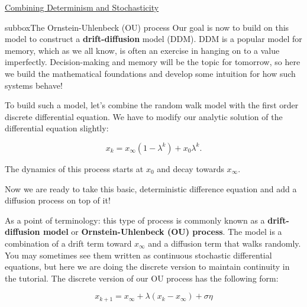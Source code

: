 \begin{textbox}{\href{https://compneuro.neuromatch.io/tutorials/W2D2_LinearSystems/student/W2D2_Tutorial3.html}{Combining Determinism and Stochasticity } }

\begin{subbox}{subbox}{The Ornstein-Uhlenbeck (OU) process}
\scriptsize
Our goal is now to build on this model to construct a \textbf{drift-diffusion} model (DDM). DDM is a popular model for memory, which as we all know, is often an exercise in hanging on to a value imperfectly. Decision-making and memory will be the topic for tomorrow, so here we build the mathematical foundations and develop some intuition for how such systems behave!

To build such a model, let's combine the random walk model with the first order discrete differential equation. We have to modify our analytic solution of the differential equation slightly:

\[x_k = x_\infty(1 - \lambda^k) + x_0 \lambda^k.\]

The dynamics of this process starts at $x_0$ and decay towards $x_{\infty}.$

Now we are ready to take this basic, deterministic difference equation and add a diffusion process on top of it!

As a point of terminology: this type of process is commonly known as a \textbf{drift-diffusion model} or \textbf{Ornstein-Uhlenbeck (OU) process}. The model is a combination of a drift term toward $x_{\infty}$ and a diffusion term that walks randomly. You may sometimes see them written as continuous stochastic differential equations, but here we are doing the discrete version to maintain continuity in the tutorial. The discrete version of our OU process has the following form:

\[x_{k+1} = x_\infty + \lambda(x_k - x_{\infty}) + \sigma \eta\]


\end{subbox}
\end{textbox}
